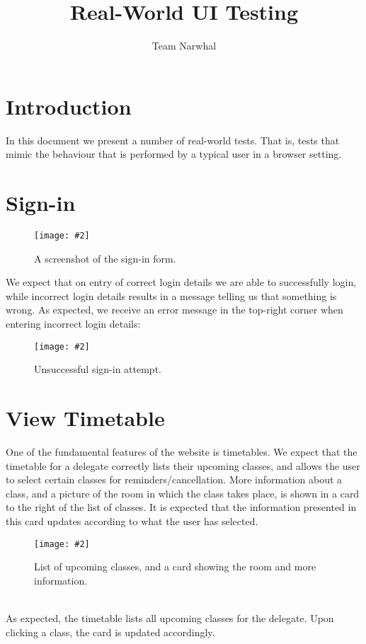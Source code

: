 \documentclass{article}
\title{Real-World UI Testing}
\author{Team Narwhal}
\date{}
\newcommand{\screen}[3]{
    \begin{figure}[h]
    \centering
    \texttt{[image: \#2]}
    \caption{#3}
    \end{figure}
}
\begin{document}
\maketitle

\section{Introduction}
In this document we present a number of real-world tests.
That is, tests that mimic the behaviour that is performed by a typical user in a browser setting.

\section{Sign-in}
\screen{0.8}{sign-in-form}{A screenshot of the sign-in form.}
We expect that on entry of correct login details we are able to successfully login, while incorrect login details results in a message telling us that something is wrong.
As expected, we receive an error message in the top-right corner when entering incorrect login details:
\screen{0.8}{sign-in-fail}{Unsuccessful sign-in attempt.}

\section{View Timetable}
One of the fundamental features of the website is timetables.
We expect that the timetable for a delegate correctly lists their upcoming classes, and allows the user to select certain classes for reminders/cancellation.
More information about a class, and a picture of the room in which the class takes place, is shown in a card to the right of the list of classes.
It is expected that the information presented in this card updates according to what the user has selected.
\screen{1}{timetable}{List of upcoming classes, and a card showing the room and more information.}\\
As expected, the timetable lists all upcoming classes for the delegate.
Upon clicking a class, the card is updated accordingly.
\end{document}
